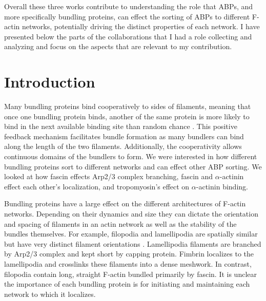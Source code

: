 Overall these three works contribute to understanding the role that ABPs, and more specifically bundling proteins, can effect the sorting of ABPs to different F-actin networks, potentially driving the distinct properties of each network. I have presented below the parts of the collaborations that I had a role collecting and analyzing and focus on the aspects that are relevant to my contribution. 


\section{Introduction}\label{ch03-introduction}

Many bundling proteins bind cooperatively to sides of filaments, 
meaning that once one bundling protein binds, another of the same 
protein is more likely to bind in the next available binding site 
than random chance \citep{winkelman_fascin-_2016}. This positive 
feedback mechanism facilitates bundle formation as many bundlers can
bind along the length of the two filaments. Additionally, the cooperativity allows continuous domains of the bundlers to form. We were interested in how different bundling proteins sort to different networks and can effect other ABP sorting. We looked at how fascin effects Arp2/3 complex branching, fascin and $\alpha$-actinin effect each other's localization, and tropomyosin's effect on $\alpha$-actinin binding. 

Bundling proteins have a large effect on the different architectures of 
F-actin networks. Depending on their dynamics and size they can dictate 
the orientation and spacing of filaments in an actin network as well as 
the stability of the bundles themselves. For example, filopodia and lamellipodia are spatially similar but have very distinct filament orientations \citep{blanchoin_actin_2014}. Lamellipodia filaments are branched by Arp2/3 complex and kept short by capping protein. Fimbrin localizes to the lamellipodia and crosslinks these filaments into a dense meshwork. In contrast, filopodia contain long, straight F-actin bundled primarily by fascin.  It is unclear the importance of each bundling protein is for initiating and maintaining each network to which it localizes. 

